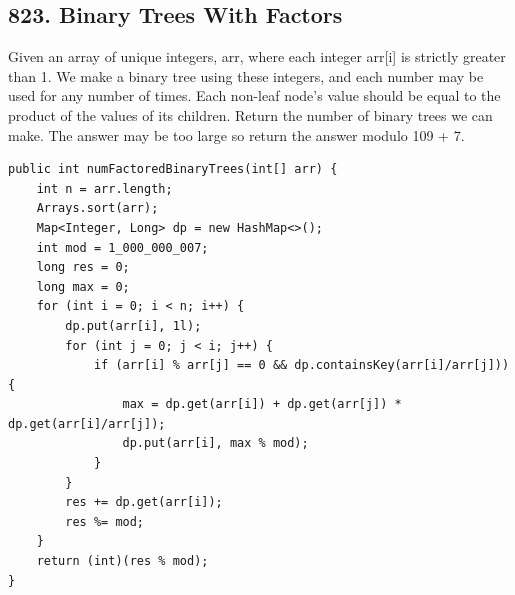 \documentclass[9pt, b5paper]{article}
\begin{document}
\subsection{823. Binary Trees With Factors}
\label{sec-4-33}
Given an array of unique integers, arr, where each integer arr[i] is strictly greater than 1.
We make a binary tree using these integers, and each number may be used for any number of times. Each non-leaf node's value should be equal to the product of the values of its children.
Return the number of binary trees we can make. The answer may be too large so return the answer modulo 109 + 7.
\begin{verbatim}
public int numFactoredBinaryTrees(int[] arr) {
    int n = arr.length;
    Arrays.sort(arr);
    Map<Integer, Long> dp = new HashMap<>();
    int mod = 1_000_000_007;
    long res = 0;
    long max = 0;
    for (int i = 0; i < n; i++) {
        dp.put(arr[i], 1l);
        for (int j = 0; j < i; j++) {
            if (arr[i] % arr[j] == 0 && dp.containsKey(arr[i]/arr[j])) {
                max = dp.get(arr[i]) + dp.get(arr[j]) * dp.get(arr[i]/arr[j]);
                dp.put(arr[i], max % mod);
            }
        }
        res += dp.get(arr[i]);
        res %= mod;
    }
    return (int)(res % mod);
}
\end{verbatim}
\end{document}
